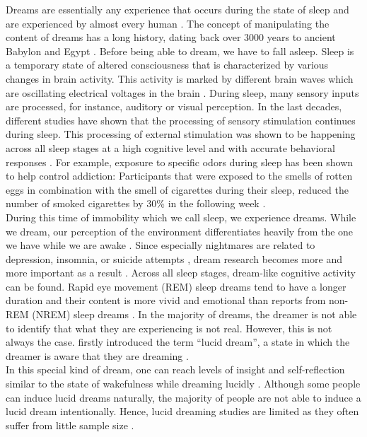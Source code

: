 \documentclass{article}
\begin{document}
Dreams are essentially any experience that occurs during the state of sleep \citep{darling1993pattern} and are experienced by almost every human \citep{pagel2003non}. The concept of manipulating the content of dreams has a long history, dating back over 3000 years to ancient Babylon and Egypt \citep{nielsen2012dream}. Before being able to dream, we have to fall asleep. Sleep is a temporary state of altered consciousness that is characterized by various changes in brain activity. This activity is marked by different brain waves which are oscillating electrical voltages in the brain \citep{abhang2016technological}. During sleep, many sensory inputs are processed, for instance, auditory or visual perception. In the last decades, different studies \citep[e.g.,][]{dement1958relation, hearne1983lucid, nielsen1993changes} have shown that the processing of sensory stimulation continues during sleep. This processing of external stimulation was shown to be happening across all sleep stages at a high cognitive level and with accurate behavioral responses \citep{turker2022behavioral}. For example, exposure to specific odors during sleep has been shown to help control addiction: Participants that were exposed to the smells of rotten eggs in combination with the smell of cigarettes during their sleep, reduced the number of smoked cigarettes by 30\% in the following week \citep{arzi2014olfactory}.
\\
During this time of immobility which we call sleep, we experience dreams. While we dream, our perception of the environment differentiates heavily from the one we have while we are awake \citep{hobson1998neuropsychology}. Since especially nightmares are related to depression, insomnia, or suicide attempts \citep{agargun2007nightmares, sandman2017nightmares, schredl2009nightmare, sjostrom2009persistent}, dream research becomes more and more important as a result \citep{okabe2018favorite}. Across all sleep stages, dream-like cognitive activity can be found. Rapid eye movement (REM) sleep dreams tend to have a longer duration and their content is more vivid and emotional than reports from non-REM (NREM) sleep dreams \citep{hobson2000dreaming}.
In the majority of dreams, the dreamer is not able to identify that what they are experiencing is not real. However, this is not always the case. \citet{van1913study} firstly introduced the term “lucid dream”, a state in which the dreamer is aware that they are dreaming \citep{laberge1985lucid}.
\\
In this special kind of dream, one can reach levels of insight and self-reflection similar to the state of wakefulness while dreaming lucidly \citep{baird2019cognitive}. Although some people can induce lucid dreams naturally, the majority of people are not able to induce a lucid dream intentionally. Hence, lucid dreaming studies are limited as they often suffer from little sample size \citep{appel2017investigating}.
\end{document}
